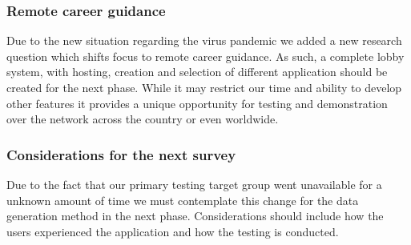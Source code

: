 \subsubsection{Remote career guidance}
Due to the new situation regarding the virus pandemic we added a new research question which shifts focus to remote career guidance. As such, a complete lobby system, with hosting, creation and selection of different application should be created for the next phase. While it may restrict our time and ability to develop other features it provides a unique opportunity for testing and demonstration over the network across the country or even worldwide.   













\subsubsection{Considerations for the next survey}
Due to the fact that our primary testing target group went unavailable for a unknown amount of time we must contemplate this change for the data generation method in the next phase.  Considerations should include how the users experienced the application and how the testing is conducted.

\cleardoublepage